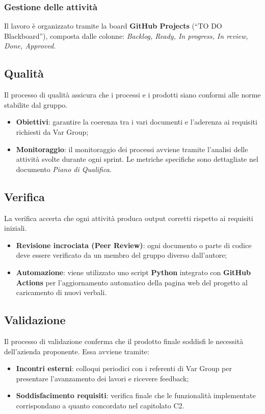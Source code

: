 \documentclass[12pt, a4paper]{article}
\begin{document}
\subsubsection{Gestione delle attività}
Il lavoro è organizzato tramite la board \textbf{GitHub Projects} (``TO DO Blackboard''), composta dalle colonne: \textit{Backlog, Ready, In progress, In review, Done, Approved}.

\subsection{Qualità}
Il processo di qualità assicura che i processi e i prodotti siano conformi alle norme stabilite dal gruppo.
\begin{itemize}
    \item \textbf{Obiettivi}: garantire la coerenza tra i vari documenti e l'aderenza ai requisiti richiesti da Var Group;
    \item \textbf{Monitoraggio}: il monitoraggio dei processi avviene tramite l'analisi delle attività svolte durante ogni sprint. Le metriche specifiche sono dettagliate nel documento \textit{Piano di Qualifica}.
\end{itemize}

\subsection{Verifica}
La verifica accerta che ogni attività produca output corretti rispetto ai requisiti iniziali.
\begin{itemize}
    \item \textbf{Revisione incrociata (Peer Review)}: ogni documento o parte di codice deve essere verificato da un membro del gruppo diverso dall'autore;
    \item \textbf{Automazione}: viene utilizzato uno script \textbf{Python} integrato con \textbf{GitHub Actions} per l'aggiornamento automatico della pagina web del progetto al caricamento di nuovi verbali.
\end{itemize}

\subsection{Validazione}
Il processo di validazione conferma che il prodotto finale soddisfi le necessità dell'azienda proponente. Essa avviene tramite:
\begin{itemize}
    \item \textbf{Incontri esterni}: colloqui periodici con i referenti di Var Group per presentare l'avanzamento dei lavori e ricevere feedback;
    \item \textbf{Soddisfacimento requisiti}: verifica finale che le funzionalità implementate corrispondano a quanto concordato nel capitolato C2.
\end{itemize}
\end{document}
